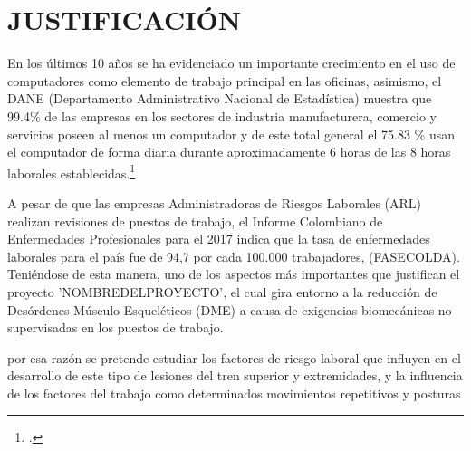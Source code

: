 \chapter{JUSTIFICACIÓN}
En los últimos 10 años se ha evidenciado un importante crecimiento en el uso de computadores como elemento de trabajo principal en las oficinas, asimismo, el DANE (Departamento Administrativo Nacional de Estadística)  muestra que 99.4\% de las empresas en los sectores de industria manufacturera, comercio y servicios poseen al menos un computador y de este total general el 75.83 \% usan el computador de forma diaria durante aproximadamente 6 horas de las 8 horas laborales establecidas.\footcite[]{Dane2013IndicadoresEmpresas}

A pesar de que las empresas Administradoras de Riesgos Laborales (ARL) realizan revisiones de puestos de trabajo, el Informe Colombiano de Enfermedades Profesionales para el 2017 indica que la tasa de enfermedades laborales para el país fue de 94,7 por cada 100.000 trabajadores, (FASECOLDA). Teniéndose de esta manera, uno de los aspectos más importantes que justifican el proyecto 'NOMBREDELPROYECTO', el cual gira entorno a la reducción de Desórdenes Músculo Esqueléticos (DME) a causa de exigencias biomecánicas no supervisadas en los puestos de trabajo.




por esa razón se pretende estudiar los factores de riesgo laboral que influyen en el desarrollo de este tipo de lesiones del tren superior y extremidades, y la influencia de los factores del trabajo como determinados movimientos repetitivos y posturas
